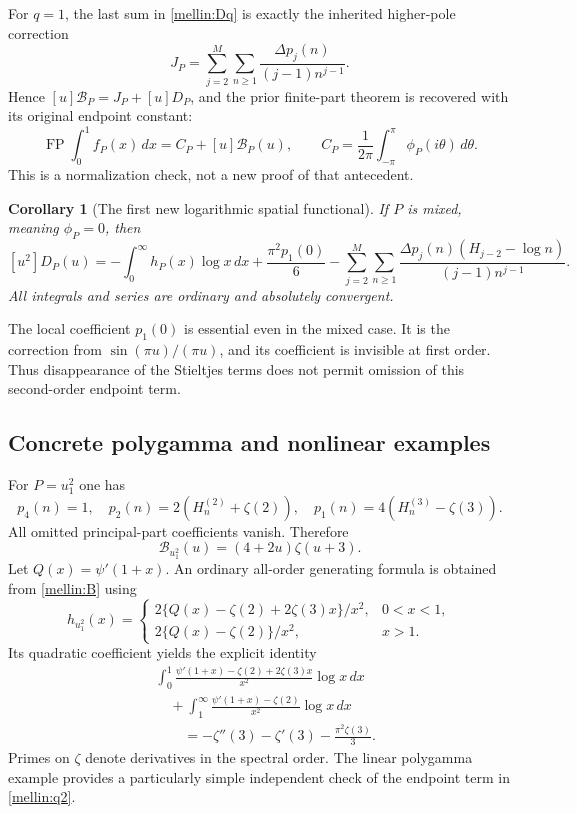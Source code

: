 \documentclass[11pt,letterpaper]{article}
\newtheorem{corollary}[theorem]{Corollary}
\theoremstyle{definition}
\theoremstyle{remark}
\numberwithin{equation}{section}
\begin{document}
For $q=1$, the last sum in \eqref{mellin:Dq} is exactly the inherited
higher-pole correction
\[
 J_P=\sum_{j=2}^{M}\sum_{n\ge1}
              \frac{\Delta p_j(n)}{(j-1)n^{j-1}}.
\]
Hence $[u]\mathcal B_P=J_P+[u]D_P$, and the prior finite-part theorem
is recovered with its original endpoint constant:
\[
 \operatorname{FP}\int_0^1f_P(x)\,dx
       =C_P+[u]\mathcal B_P(u),\qquad
 C_P=\frac1{2\pi}\int_{-\pi}^{\pi}\phi_P(i\theta)\,d\theta.
\]
This is a normalization check, not a new proof of that antecedent.

\begin{corollary}[The first new logarithmic spatial functional]
\label{mellin:mixedq2}
If $P$ is mixed, meaning $\phi_P=0$, then
\begin{equation}\label{mellin:q2}
 \boxed{[u^2]D_P(u)=
 -\int_0^\infty h_P(x)\log x\,dx+\frac{\pi^2p_1(0)}6
 -\sum_{j=2}^{M}\sum_{n\ge1}
 \frac{\Delta p_j(n)(H_{j-2}-\log n)}{(j-1)n^{j-1}}.}
\end{equation}
All integrals and series are ordinary and absolutely convergent.
\end{corollary}

The local coefficient $p_1(0)$ is essential even in the mixed case.
It is the correction from $\sin(\pi u)/(\pi u)$, and its coefficient
is invisible at first order.  Thus disappearance of the Stieltjes
terms does not permit omission of this second-order endpoint term.

\subsection{Concrete polygamma and nonlinear examples}

For $P=u_1^2$ one has
\[
 p_4(n)=1,\quad p_2(n)=2(H_n^{(2)}+\zeta(2)),\quad
 p_1(n)=4(H_n^{(3)}-\zeta(3)).
\]
All omitted principal-part coefficients vanish.  Therefore
\begin{equation}\label{mellin:trigammasquare}
 \mathcal B_{u_1^2}(u)=(4+2u)\zeta(u+3).
\end{equation}
Let $Q(x)=\psi'(1+x)$.  An ordinary all-order generating formula is
obtained from \eqref{mellin:B} using
\[
 h_{u_1^2}(x)=
 \begin{cases}
 2\{Q(x)-\zeta(2)+2\zeta(3)x\}/x^2,&0<x<1,\\
 2\{Q(x)-\zeta(2)\}/x^2,&x>1.
 \end{cases}
\]
Its quadratic coefficient yields the explicit identity
\begin{equation}\label{mellin:trigamma-log}
 \boxed{\begin{aligned}
 &\int_0^1\frac{\psi'(1+x)-\zeta(2)+2\zeta(3)x}{x^2}\log x\,dx\\
 &\quad+\int_1^\infty\frac{\psi'(1+x)-\zeta(2)}{x^2}\log x\,dx\\
 &\qquad=-\zeta''(3)-\zeta'(3)-\frac{\pi^2\zeta(3)}3.
 \end{aligned}}
\end{equation}
Primes on $\zeta$ denote derivatives in the spectral order.  The
linear polygamma example provides a particularly simple independent
check of the endpoint term in \eqref{mellin:q2}.
\end{document}

